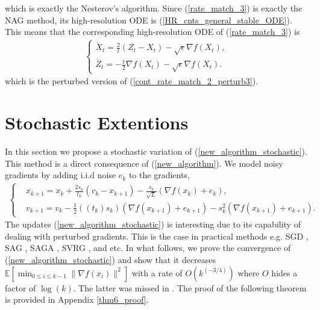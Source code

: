 \documentclass{article}
\theoremstyle{plain}
\theoremstyle{definition}
\theoremstyle{remark}
\begin{document}
which is exactly the Nesterov's algorithm. Since (\ref{rate_match_3}) is exactly the NAG method, its high-resolution ODE is (\ref{HR_cnts_general_stable_ODE}). This means that the corresponding high-resolution ODE of (\ref{rate_match_3}) is 
\begin{align}\label{cont_rate_match_2_perturb4}
    \left\{\begin{array}{l}
         \dot X_t = \frac{2}{t}(Z_t-X_t)-\sqrt{\epsilon}\nabla f(X_t),  \\
          \dot Z_t = -\frac{t}{2}\nabla f(X_t)-\sqrt{\epsilon}\nabla f(X_t).
    \end{array}
    \right.
\end{align}
which is the perturbed version of (\ref{cont_rate_match_2_perturb3}).

\section{Stochastic Extentions}
In this section we propose a stochastic variation of (\ref{new_algorithm_stochastic}). This method is a direct consequence of (\ref{new_algorithm}). We model noisy gradients by adding i.i.d noise $e_k$ to the gradients, 
\begin{align}\label{new_algorithm_stochastic}
   \left\{ \begin{array}{ll}
    &x_{k+1}   =    x_{k} + \frac{2s_k}{t_k}(v_k-x_{k+1})-\frac{s_k}{\sqrt{L}}(\nabla f(x_k)+e_k),\\
     &v_{k+1}    = v_k -\tfrac{1}{2}((t_k)s_k)(\nabla f(x_{k+1})+e_{k+1})-s_k^2(\nabla f(x_{k+1})+e_{k+1}). 
    \end{array}\right.
\end{align}
The updates (\ref{new_algorithm_stochastic}) is interesting due to its capability of dealing with perturbed gradients. This is the case in practical methods e.g. SGD \citep{bottou2010large}, SAG \citep{schmidt2017minimizing}, SAGA \citep{defazio2014saga}, SVRG \citep{johnson2013accelerating}, and etc.
In what follows, we prove the convergence of (\ref{new_algorithm_stochastic}) and show that it decreases $\mathbb E\left[\min_{0\leq i\leq k-1}\|\nabla f(x_i)\|^2 \right]$ with a rate of $O(k^{(-3/4)})$ where $O$ hides a factor of $\log(k)$. The latter was missed in \cite{pmlr-v108-laborde20a}. The proof of the following theorem is provided in Appendix \ref{thm6_proof}.
\end{document}
